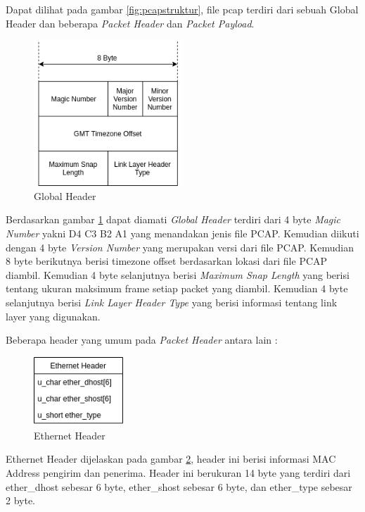 \documentclass[./skripsi.tex]{subfiles}
\begin{document}
\par Dapat dilihat pada gambar \ref{fig:pcapstruktur}, file pcap terdiri dari sebuah Global Header dan beberapa \textit{Packet Header} dan \textit{Packet Payload}.
\begin{figure}%
\centering
\includegraphics[width=0.5\textwidth]{public/assets/img/GlobalHeader.png}
\caption{Global Header}
\label{fig:globalheader}
\end{figure}
\par Berdasarkan gambar \ref{fig:globalheader} dapat diamati \textit{Global Header} terdiri dari 4 byte \textit{Magic Number} yakni D4 C3 B2 A1 yang menandakan jenis file PCAP. Kemudian diikuti dengan 4 byte \textit{Version Number} yang merupakan versi dari file PCAP. Kemudian 8 byte berikutnya berisi timezone offset berdasarkan lokasi dari file PCAP diambil. Kemudian 4 byte selanjutnya berisi \textit{Maximum Snap Length} yang berisi tentang ukuran maksimum frame setiap packet yang diambil. Kemudian 4 byte selanjutnya berisi  \textit{Link Layer Header Type} yang berisi informasi tentang link layer yang digunakan.
\par Beberapa header yang umum pada \textit{Packet Header} antara lain :
\begin{figure}%
    \centering
    \includegraphics[width=0.3\textwidth]{public/assets/img/EthernetHeader.png}
    \caption{Ethernet Header}
    \label{fig:ethernetheader}
\end{figure}
\par Ethernet Header dijelaskan pada gambar \ref{fig:ethernetheader}, header ini berisi informasi MAC Address pengirim dan penerima. Header ini berukuran 14 byte yang terdiri dari ether\_dhost sebesar 6 byte, ether\_shost sebesar 6 byte, dan ether\_type sebesar 2 byte.
\end{document}
